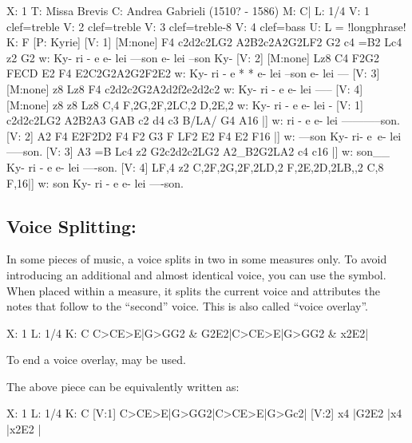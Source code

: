 \documentclass[a4paper,fullpage,12pt]{book}
\begin{document}

{\small
\begin{abcsource}
X: 1
T: Missa Brevis
C: Andrea Gabrieli (1510? - 1586)
M: C|
L: 1/4
V: 1 clef=treble
V: 2 clef=treble
V: 3 clef=treble-8
V: 4 clef=bass
U: L = !longphrase!
K: F
%
[P: Kyrie]
[V: 1] [M:none] F4 c2d2c2LG2 A2B2c2A2G2LF2 G2 c4 =B2 Lc4 z2 G2
w: Ky- ri - e e- lei ---son e- lei --son Ky-
[V: 2] [M:none] Lz8 C4 F2G2 FECD E2 F4 E2C2G2A2G2F2E2
w: Ky- ri - e * * e- lei --son e- lei ---
[V: 3] [M:none] z8 Lz8 F4 c2d2c2G2A2d2f2e2d2c2
w: Ky- ri - e e- lei -----
[V: 4] [M:none] z8 z8 Lz8 C,4 F,2G,2F,2LC,2 D,2E,2
w: Ky- ri - e e- lei -
%
[V: 1] c2d2c2LG2 A2B2A3 GAB c2 d4 c3 B/LA/ G4 A16      |]
w: ri - e e- lei -----------son.
[V: 2] A2 F4 E2F2D2 F4 F2 G3 F LF2 E2 F4 E2 F16        |]
w: ---son Ky- ri- e~e- lei -----son.
[V: 3] A3 =B Lc4 z2 G2c2d2c2LG2 A2_B2G2LA2 c4 c16      |]
w: son__ Ky- ri - e e- lei ----son.
[V: 4] LF,4 z2 C,2F,2G,2F,2LD,2 F,2E,2D,2LB,,2 C,8 F,16|]
w: son Ky- ri - e e- lei ----son.
\end{abcsource}
}



\subsection{Voice Splitting: \icmd{\&}}

In some pieces of music, a voice splits in two in some measures only.
To avoid introducing an additional and almost identical voice, you can
use the \car{\&} symbol. When placed within a measure, it splits the
current voice and attributes the notes that follow to the ``second''
voice. This is also called ``voice overlay''.

\begin{abcsource}
X: 1
L: 1/4
K: C
C>CE>E|G>GG2 & G2E2|C>CE>E|G>GG2 & x2E2|
\end{abcsource}


To end a voice overlay, \cmd{\&)} may be used.

The above piece can be equivalently written as:

\begin{abcsource}
X: 1
L: 1/4
K: C
[V:1] C>CE>E|G>GG2|C>CE>E|G>Gc2|
[V:2] x4    |G2E2 |x4    |x2E2 |
\end{abcsource}
\end{document}
